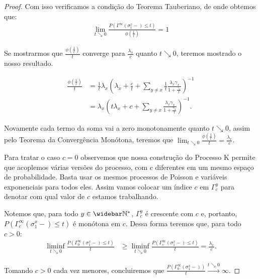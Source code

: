\begin{proof}
  Com isso verificamos a condição do Teorema Tauberiano, de onde
  obtemos que:
  \begin{align*}
    \lim_{t \searrow 0} \frac{P( \Gamma^\infty(\sigma^x_1-) \leq
      t)}{\phi(\frac{1}{t})} = 1
  \end{align*}

  Se mostrarmos que $\frac{\phi(\frac{1}{t})}{t}$ converge para
  $\frac{\lambda_x}{c}$ quanto $t \searrow 0$, teremos mostrado o
  nosso resultado.

  \begin{align*}
    \frac{\phi(\frac{1}{t})}{t} &= \frac{1}{t} \lambda_x \left(
      \lambda_x + \frac{c}{t} + \sum_{y \neq x} \frac{1}{t}
      \frac{\lambda_x \gamma_x}{1 + \frac{\gamma_x}{t}} \right)^{-1} \\
    &= \lambda_x \left( t\lambda_x + c + \sum_{y \neq x}
      \frac{\lambda_x \gamma_x}{1 + \frac{\gamma_x}{t}} \right)^{-1}.
  \end{align*}

  Novamente cada termo da soma vai a zero monotonamente quanto $t
  \searrow 0$, assim pelo Teorema da Convergência Monótona, teremos que
  $\lim_{t \searrow 0} \frac{\phi(\frac{1}{t})}{t} =
  \frac{\lambda_x}{c}$.

  Para tratar o caso $c = 0$ observemos que nossa construção do
  Processo K permite que acoplemos várias versões do processo, com $c$
  diferentes em um mesmo espaço de probabilidade. Basta usar os mesmos
  processos de Poisson e variáveis exponenciais para todos eles. Assim
  vamos colocar um índice $c$ em $\Gamma^y_c$ para denotar com qual
  valor de $c$ estamos trabalhando.

  Notemos que, para todo $y \in \Nzb$, $\Gamma^y_c$ é crescente com
  $c$ e, portanto, $P ( \Gamma^\infty_c(\sigma^x_1-) \leq t)$ é
  monótona em $c$.  Dessa forma teremos que, para todo $c > 0$:
  \begin{align*}
    \liminf_{t \searrow 0} \frac{P ( \Gamma^\infty_0(\sigma^x_1-) \leq
      t)}{t} &\geq \liminf_{t \searrow 0} \frac{P (
      \Gamma^\infty_c(\sigma^x_1-) \leq t)}{t}
    = \frac{\lambda_x}{c}.
  \end{align*}

  Tomando $c > 0$ cada vez menores, concluiremos que $\frac{P (
    \Gamma^\infty_0(\sigma^x_1-))}{t} \xrightarrow{t \searrow 0}
  \infty$.
\end{proof}

